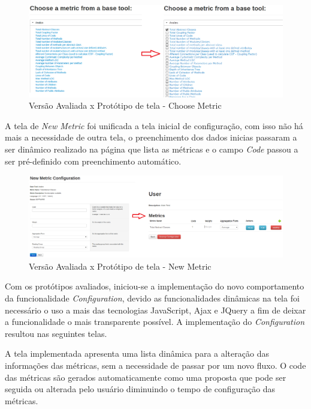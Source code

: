 \graphicspath{{figuras/}}
\begin{figure}[H]
\centering
\includegraphics[width=1.0\textwidth]{PrototipoChooseMetric}
\caption{Versão Avaliada x Protótipo de tela - Choose Metric}
\label{parallel-coordinate}
\end{figure}

A tela de \textit{New Metric} foi unificada a tela inicial de configuração, com isso não há mais a necessidade de outra tela, o preenchimento dos dados inicias passaram a ser dinâmico realizado na página que lista as métricas e o campo \textit{Code} passou a ser pré-definido com preenchimento automático. 

\graphicspath{{figuras/}}
\begin{figure}[H]
\centering
\includegraphics[width=1.0\textwidth]{PrototipoNewMetric}
\caption{Versão Avaliada x Protótipo de tela - New Metric}
\label{parallel-coordinate}
\end{figure}

Com os protótipos avaliados, iniciou-se a implementação do novo comportamento da funcionalidade \textit{Configuration}, devido as funcionalidades dinâmicas na tela foi necessário o uso a mais das tecnologias JavaScript, Ajax e JQuery a fim de deixar a funcionalidade o mais transparente possível. A implementação do \textit{Configuration} resultou nas seguintes telas.

A tela implementada apresenta uma lista dinâmica para a alteração das informações das métricas, sem a necessidade de passar por um novo fluxo. O code das métricas são gerados automaticamente como uma proposta que pode ser seguida ou alterada pelo usuário diminuindo o tempo de configuração das métricas.

